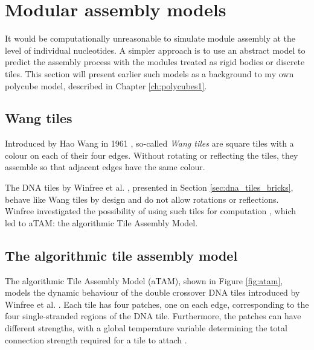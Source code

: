 \section{Modular assembly models}
It would be computationally unreasonable to simulate module assembly at the level of individual nucleotides. A simpler approach is to use an abstract model to predict the assembly process with the modules treated as rigid bodies or discrete tiles. This section will present earlier such models as a background to my own polycube model, described in Chapter \ref{ch:polycubes1}.

\subsection{Wang tiles}
Introduced by Hao Wang in 1961 \cite{wang1961proving}, so-called \emph{Wang tiles} are square tiles with a colour on each of their four edges. Without rotating or reflecting the tiles, they assemble so that adjacent edges have the same colour.


The DNA tiles by Winfree et al. \cite{winfree1998design}, presented in Section \ref{sec:dna_tiles_bricks}, behave like Wang tiles by design and do not allow rotations or reflections. Winfree investigated the possibility of using such tiles for computation \cite{winfree1998algorithmic}, which led to aTAM: the algorithmic Tile Assembly Model.

\subsection{The algorithmic tile assembly model}
\label{sec:atam}


The algorithmic Tile Assembly Model (aTAM), shown in Figure \ref{fig:atam}, models the dynamic behaviour of the double crossover DNA tiles introduced by Winfree et al. \cite{winfree1998design}. Each tile has four patches, one on each edge, corresponding to the four single-stranded regions of the DNA tile. Furthermore, the patches can have different strengths, with a global temperature variable determining the total connection strength required for a tile to attach \cite{doty2012theory}.

